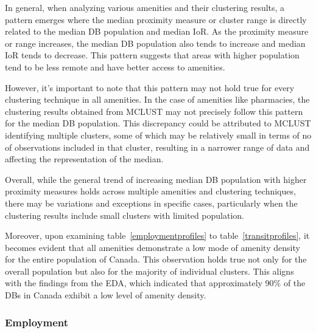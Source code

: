 \documentclass[11pt, a4paper]{article}
\begin{document}
In general, when analyzing various amenities and their clustering results, a pattern emerges where the median proximity measure or cluster range is directly related to the median DB population and median IoR. As the proximity measure or range increases, the median DB population also tends to increase and median IoR tends to decrease. This pattern suggests that areas with higher population tend to be less remote and have better access to amenities.
\par
However, it's important to note that this pattern may not hold true for every clustering technique in all amenities. In the case of amenities like pharmacies, the clustering results obtained from MCLUST may not precisely follow this pattern for the median DB population. This discrepancy could be attributed to MCLUST identifying multiple clusters, some of which may be relatively small in terms of no of observations included in that cluster, resulting in a narrower range of data and affecting the representation of the median.
\par
Overall, while the general trend of increasing median DB population with higher proximity measures holds across multiple amenities and clustering techniques, there may be variations and exceptions in specific cases, particularly when the clustering results include small clusters with limited population.
\par
Moreover, upon examining table~\ref{employmentprofiles} to table~\ref{transitprofiles}, it becomes evident that all amenities demonstrate a low mode of amenity density for the entire population of Canada. This observation holds true not only for the overall population but also for the majority of individual clusters. This aligns with the findings from the EDA, which indicated that approximately 90\% of the DBs in Canada exhibit a low level of amenity density.



\subsubsection{Employment}
\end{document}
